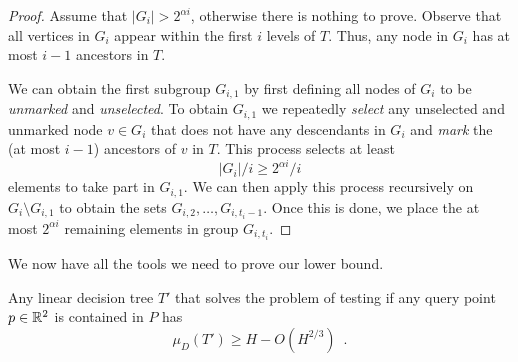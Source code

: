 \documentclass[charterfonts,lotsofwhite]{patmorin}
\begin{document}
\begin{proof}
Assume that $|G_i|> 2^{\alpha i}$, otherwise there is nothing to
prove.  Observe that all vertices in $G_i$ appear within the first $i$
levels of $T$.  Thus, any node in $G_i$ has at most $i-1$ ancestors in
$T$.  

We can obtain the first subgroup $G_{i,1}$ by first defining all nodes of
$G_i$ to be \emph{unmarked} and \emph{unselected}.  To obtain
$G_{i,1}$ we repeatedly \emph{select} any unselected and unmarked
node $v\in G_i$ that does not have any descendants in $G_i$ and
\emph{mark} the (at most $i-1$) ancestors of $v$ in $T$.  This
process selects at least
\[
   |G_i|/i \ge 2^{\alpha i}/i
\] 
elements to take part in $G_{i,1}$.  We can then apply this process
recursively on $G_i\setminus G_{i,1}$ to obtain the sets
$G_{i,2},\ldots,G_{i,t_i-1}$.  Once this is done, we place the at most
$2^{\alpha i}$ remaining elements in group $G_{i,t_i}$.
\end{proof}

We now have all the tools we need to prove our lower bound.

\begin{thm}
Any linear decision tree $T'$ that solves the problem of testing 
if any query point 
$p\in\mathbb{R}^2$ is contained in $P$ has
\[
   \mu_D(T') \ge H - O(H^{2/3}) \enspace .
\]
\end{thm}
\end{document}
